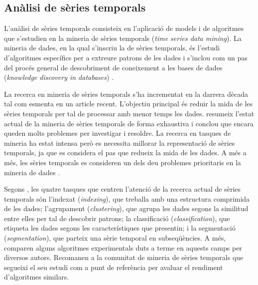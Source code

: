\subsection{Anàlisi de sèries temporals}

L'anàlisi de sèries temporals consisteix en l'aplicació de models i de algoritmes que s'estudien en la mineria de sèries temporals (\emph{time series data mining}). La mineria de dades, en la qual s'inscriu la de sèries temporals, és l'estudi d'algoritmes específics per a extreure patrons de les dades i s'inclou com un pas del procés general de descobriment de coneixement a les bases de dades (\emph{knowledge discovery in databases}) \parencite{fayyad96,last01}.

La recerca en mineria de sèries temporals s'ha incrementat en la darrera dècada tal com esmenta \textcite{fu11} en un article recent. L'objectiu principal és reduir la mida de les sèries temporals per tal de processar amb menor temps les dades.
\citeauthor{fu11} resumeix l'estat actual de la mineria de sèries temporals de forma exhaustiva i conclou que encara queden molts problemes per investigar i resoldre. La recerca en tasques de mineria ha estat intensa però es necessita millorar la representació de sèries temporals, ja que es considera el pas que redueix la mida de les dades. A més a més, les sèries temporals es consideren un dels deu problemes prioritaris  en la mineria de dades \parencite{yangwu06}.

Segons \textcite{keogh02}, les quatre tasques que centren l'atenció de la recerca actual de sèries temporals són
l'indexat (\emph{indexing}), que treballa amb una estructura comprimida de les dades;
l'agrupament (\emph{clustering}), que agrupa les dades segons la similitud entre elles per tal de descobrir patrons;
la classificació (\emph{classification}), que etiqueta les dades segons les característiques que presentin;
i la segmentació (\emph{segmentation}), que parteix una sèrie temporal en subseqüències.
A més, \citeauthor{keogh02} comparen  alguns algoritmes experimentals duts a terme en aquests camps per diversos autors. Recomanen a la comunitat de mineria de sèries temporals que segueixi el seu estudi com a punt de referència per avaluar el rendiment d'algoritmes similars.

